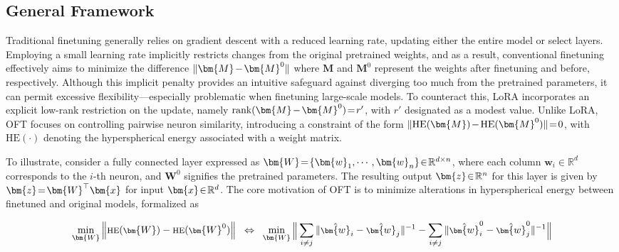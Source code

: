 \subsection{General Framework}

Traditional finetuning generally relies on gradient descent with a reduced learning rate, updating either the entire model or select layers. Employing a small learning rate implicitly restricts changes from the original pretrained weights, and as a result, conventional finetuning effectively aims to minimize the difference $\thickmuskip=2mu \medmuskip=2mu \| \bm{M} - \bm{M}^0\|$ where $\bm{M}$ and $\bm{M}^0$ represent the weights after finetuning and before, respectively. Although this implicit penalty provides an intuitive safeguard against diverging too much from the pretrained parameters, it can permit excessive flexibility—especially problematic when finetuning large-scale models. To counteract this, LoRA incorporates an explicit low-rank restriction on the update, namely $\thickmuskip=2mu \medmuskip=2mu \text{rank}(\bm{M} - \bm{M}^0)=r'$, with $r'$ designated as a modest value. Unlike LoRA, OFT focuses on controlling pairwise neuron similarity, introducing a constraint of the form $\thickmuskip=2mu \medmuskip=2mu \| \text{HE}(\bm{M})-\text{HE}(\bm{M}^0) \|=0$, with $\text{HE}(\cdot)$ denoting the hyperspherical energy associated with a weight matrix. 

To illustrate, consider a fully connected layer expressed as $\thickmuskip=2mu \medmuskip=2mu \bm{W}=\{\bm{w}_1,\cdots,\bm{w}_n\}\in\mathbb{R}^{d\times n}$, where each column $\bm{w}_i\in\mathbb{R}^{d}$ corresponds to the $i$-th neuron, and $\bm{W}^0$ signifies the pretrained parameters. The resulting output $\thickmuskip=2mu \medmuskip=2mu \bm{z}\in\mathbb{R}^n$ for this layer is given by $\thickmuskip=2mu \medmuskip=2mu \bm{z}=\bm{W}^\top\bm{x}$ for input $\thickmuskip=2mu \medmuskip=2mu \bm{x}\in\mathbb{R}^d$. The core motivation of OFT is to minimize alterations in hyperspherical energy between finetuned and original models, formalized as

\begin{equation}\label{eq:oft_principle}
\footnotesize
\min_{\bm{W}} \left\| \text{HE}(\bm{W})-\text{HE}(\bm{W}^0)\right\|~~\Leftrightarrow~~\min_{\bm{W}} \bigg{\|} \sum_{i\neq j} \|\hat{\bm{w}}_i-\hat{\bm{w}}_j\|^{-1}-\sum_{i\neq j} \|\hat{\bm{w}}^0_i-\hat{\bm{w}}^0_j\|^{-1}\bigg{\|}
\end{equation}

